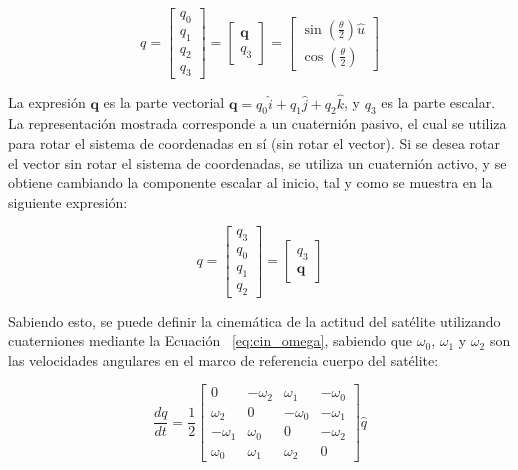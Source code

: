 \begin{equation}
	q = \begin{bmatrix}
		q_0 \\
		q_1 \\
		q_2 \\
		q_3
	\end{bmatrix}
	= \begin{bmatrix}
		\mathbf{q} \\
		q_3
	\end{bmatrix}
	= \begin{bmatrix}
		\sin\left(\frac{\theta}{2}\right) \hat{u} \\
		\cos\left(\frac{\theta}{2}\right)
	\end{bmatrix}
	\label{eq:cin_quat}
\end{equation}

La expresión \( \mathbf{q} \) es la parte vectorial \( \mathbf{q} = q_0 \hat{i} + q_1 \hat{j} + q_2 \hat{k} \), y \( q_3 \) es la parte escalar. La representación mostrada corresponde a un cuaternión pasivo, el cual se utiliza para rotar el sistema de coordenadas en sí (sin rotar el vector). Si se desea rotar el vector sin rotar el sistema de coordenadas, se utiliza un cuaternión activo, y se obtiene cambiando la componente escalar al inicio, tal y como se muestra en la siguiente expresión:

\[
q = \begin{bmatrix}
	q_3 \\
	q_0 \\
	q_1 \\
	q_2
\end{bmatrix}
= \begin{bmatrix}
	q_3 \\
	\mathbf{q}
\end{bmatrix}
\]

Sabiendo esto, se puede definir la cinemática de la actitud del satélite utilizando cuaterniones mediante la Ecuación ~\ref{eq:cin_omega}, sabiendo que \( \omega_0 \), \( \omega_1 \) y \( \omega_2 \) son las velocidades angulares en el marco de referencia cuerpo del satélite:

\begin{equation}
	\frac{dq}{dt} = \frac{1}{2}
	\begin{bmatrix}
		0 & -\omega_2 & \omega_1 & -\omega_0 \\
		\omega_2 & 0 & -\omega_0 & -\omega_1 \\
		-\omega_1 & \omega_0 & 0 & -\omega_2 \\
		\omega_0 & \omega_1 & \omega_2 & 0
	\end{bmatrix}
	\hat{q}
	\label{eq:cin_omega}
\end{equation}

